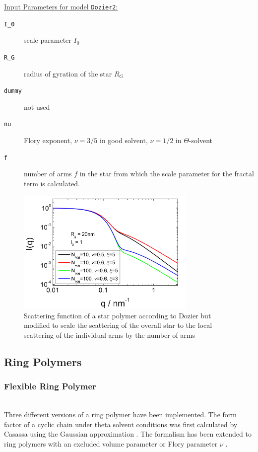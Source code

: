 \vspace{5mm}

\noindent
\underline{Input Parameters for model \texttt{Dozier2}:}
\begin{description}
\item[\texttt{I\_0}] scale parameter $I_0$
\item[\texttt{R\_G}] radius of gyration of the star $R_G$
\item[\texttt{dummy}] not used
\item[\texttt{nu}] Flory exponent, $\nu=3/5$ in good solvent, $\nu=1/2$ in $\Theta$-solvent
\item[\texttt{f}]  number of arms $f$ in the star from which the scale parameter for the fractal term is calculated.
\end{description}
\vspace{5mm}

\begin{figure}[htb]
\begin{center}
\includegraphics[width=0.768\textwidth,height=0.588\textwidth]{Dozier2_Iq.png}
\end{center}
\caption{Scattering function of a star polymer according to Dozier but modified
to scale the scattering of the overall star to the local scattering of the individual arms
by the number of arms} \label{fig:IQDozierStar2}
\end{figure}
\clearpage

\subsection{Ring Polymers}
\subsubsection{Flexible Ring Polymer }
\label{sect:FlexibleRingPolymer}
~\\
Three different versions of a ring polymer have been implemented. The form factor of a cyclic chain under theta solvent conditions was first calculated by Casassa
using the Gaussian approximation \cite{Casassa1965,Burchard1996}. The formalism has been extended to ring polymers with an excluded volume parameter or Flory parameter $\nu$ \cite{Bensafi2000,Goosen2015}.

